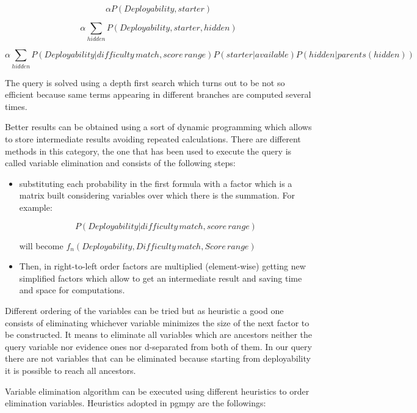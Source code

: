 \documentclass[a4paper,10pt]{report}
\begin{document}
\[ \alpha P(Deployability,starter) \]

\[ \alpha \sum_{hidden} P(Deployability,starter, hidden) \]

\[ \alpha \sum_{hidden} P(Deployability|difficulty \,match, score\, range) P(starter|available)P(hidden|parents(hidden)) \]

The query is solved using a depth first search which turns out to be not so efficient because same terms appearing in different branches are computed several times.

Better results can be obtained using a sort of dynamic programming which allows to store intermediate results avoiding repeated calculations. There are different methods in this category, the one that has been used to execute the query is called variable elimination and consists of the following steps:

\begin{itemize}
    \item substituting each probability in the first formula with a factor which is a matrix built considering variables over which there is the summation. For example:
    
    \[ P(Deployability|difficulty\,match,score\,range) \]
    
    will become $f_n(Deployability, Difficulty\,match, Score\,range)$
    
    \item Then, in right-to-left order factors are multiplied (element-wise) getting new simplified factors which allow to get an intermediate result and saving time and space for computations.
    
\end{itemize}

Different ordering of the variables can be tried but as heuristic a good one consists of eliminating whichever variable minimizes the size of the next factor to be constructed.
It means to eliminate all variables which are ancestors neither the query variable nor evidence ones nor d-separated from both of them.\newline\newline
In our query there are not variables that can be eliminated because starting from deployability it is possible to reach all ancestors.
\newline

Variable elimination algorithm can be executed using different heuristics to order elimination variables. Heuristics adopted in pgmpy are the followings:
\end{document}
